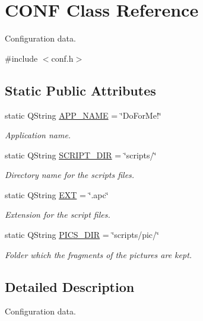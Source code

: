 \hypertarget{struct_c_o_n_f}{\section{C\-O\-N\-F Class Reference}
\label{struct_c_o_n_f}
}


Configuration data.  




{\ttfamily \#include $<$conf.\-h$>$}

\subsection*{Static Public Attributes}
\begin{DoxyCompactItemize}
\item 
static Q\-String \hyperlink{struct_c_o_n_f_a853a9ddc60b4267b40e436f0d990bea0}{A\-P\-P\-\_\-\-N\-A\-M\-E} = \char`\"{}Do\-For\-Me!\char`\"{}
\begin{DoxyCompactList}\small\item\em Application name. \end{DoxyCompactList}\item 
static Q\-String \hyperlink{struct_c_o_n_f_a28e3d7259ab1d7c0415d7e8cf48a76bd}{S\-C\-R\-I\-P\-T\-\_\-\-D\-I\-R} = \char`\"{}scripts/\char`\"{}
\begin{DoxyCompactList}\small\item\em Directory name for the scripts files. \end{DoxyCompactList}\item 
static Q\-String \hyperlink{struct_c_o_n_f_a341328f597b1f2990733b7ac30a8cb88}{E\-X\-T} = \char`\"{}.apc\char`\"{}
\begin{DoxyCompactList}\small\item\em Extension for the script files. \end{DoxyCompactList}\item 
static Q\-String \hyperlink{struct_c_o_n_f_abc4633bb8e9a6a14e116abd19f2f391c}{P\-I\-C\-S\-\_\-\-D\-I\-R} = \char`\"{}scripts/pic/\char`\"{}
\begin{DoxyCompactList}\small\item\em Folder which the fragments of the pictures are kept. \end{DoxyCompactList}\end{DoxyCompactItemize}


\subsection{Detailed Description}
Configuration data. 

